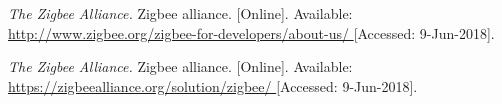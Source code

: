 \begin{thebibliography}{9}













\textit{
The Zigbee Alliance.
}
Zigbee alliance.
[Online]. Available:
\url{
http://www.zigbee.org/zigbee-for-developers/about-us/
}
[Accessed: 9-Jun-2018].



\textit{
The Zigbee Alliance.
}
Zigbee alliance.
[Online]. Available:
\url{
https://zigbeealliance.org/solution/zigbee/
}
[Accessed: 9-Jun-2018].







\end{thebibliography}

